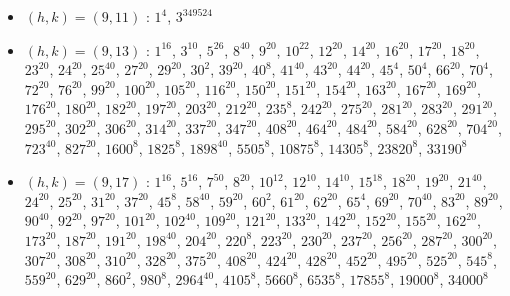 \begin{itemize}
\item $(h,k)=(9,11)$ : $1^{4}$, $3^{349524}$
\item $(h,k)=(9,13)$ : $1^{16}$, $3^{10}$, $5^{26}$, $8^{40}$, $9^{20}$, $10^{22}$, $12^{20}$, $14^{20}$, $16^{20}$, $17^{20}$, $18^{20}$, $23^{20}$, $24^{20}$, $25^{40}$, $27^{20}$, $29^{20}$, $30^{2}$, $39^{20}$, $40^{8}$, $41^{40}$, $43^{20}$, $44^{20}$, $45^{4}$, $50^{4}$, $66^{20}$, $70^{4}$, $72^{20}$, $76^{20}$, $99^{20}$, $100^{20}$, $105^{20}$, $116^{20}$, $150^{20}$, $151^{20}$, $154^{20}$, $163^{20}$, $167^{20}$, $169^{20}$, $176^{20}$, $180^{20}$, $182^{20}$, $197^{20}$, $203^{20}$, $212^{20}$, $235^{8}$, $242^{20}$, $275^{20}$, $281^{20}$, $283^{20}$, $291^{20}$, $295^{20}$, $302^{20}$, $306^{20}$, $314^{20}$, $337^{20}$, $347^{20}$, $408^{20}$, $464^{20}$, $484^{20}$, $584^{20}$, $628^{20}$, $704^{20}$, $723^{40}$, $827^{20}$, $1600^{8}$, $1825^{8}$, $1898^{40}$, $5505^{8}$, $10875^{8}$, $14305^{8}$, $23820^{8}$, $33190^{8}$
\item $(h,k)=(9,17)$ : $1^{16}$, $5^{16}$, $7^{50}$, $8^{20}$, $10^{12}$, $12^{10}$, $14^{10}$, $15^{18}$, $18^{20}$, $19^{20}$, $21^{40}$, $24^{20}$, $25^{20}$, $31^{20}$, $37^{20}$, $45^{8}$, $58^{40}$, $59^{20}$, $60^{2}$, $61^{20}$, $62^{20}$, $65^{4}$, $69^{20}$, $70^{40}$, $83^{20}$, $89^{20}$, $90^{40}$, $92^{20}$, $97^{20}$, $101^{20}$, $102^{40}$, $109^{20}$, $121^{20}$, $133^{20}$, $142^{20}$, $152^{20}$, $155^{20}$, $162^{20}$, $173^{20}$, $187^{20}$, $191^{20}$, $198^{40}$, $204^{20}$, $220^{8}$, $223^{20}$, $230^{20}$, $237^{20}$, $256^{20}$, $287^{20}$, $300^{20}$, $307^{20}$, $308^{20}$, $310^{20}$, $328^{20}$, $375^{20}$, $408^{20}$, $424^{20}$, $428^{20}$, $452^{20}$, $495^{20}$, $525^{20}$, $545^{8}$, $559^{20}$, $629^{20}$, $860^{2}$, $980^{8}$, $2964^{40}$, $4105^{8}$, $5660^{8}$, $6535^{8}$, $17855^{8}$, $19000^{8}$, $34000^{8}$

\end{itemize}
